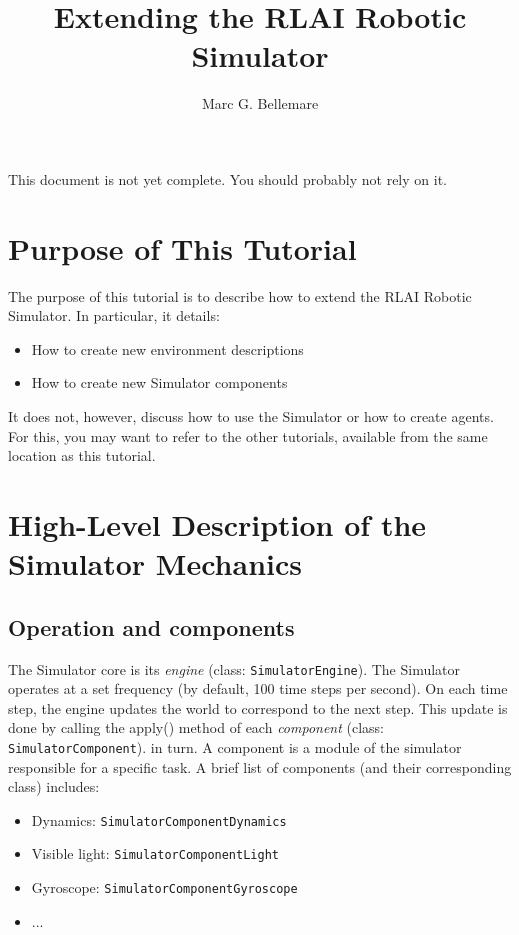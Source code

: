 \documentclass[12pt]{article}
\author{Marc G. Bellemare}
\title{Extending the RLAI Robotic Simulator}
\newcommand{\code}[1]{\texttt{#1}}
\newcommand{\keyword}[1]{\textit{#1}}
\begin{document}
\maketitle

This document is not yet complete. You should probably not rely on it.

\section{Purpose of This Tutorial}

The purpose of this tutorial is to describe how to extend the RLAI Robotic
Simulator. In particular, it details:

\begin{itemize}
\item{How to create new environment descriptions}
\item{How to create new Simulator components}
\end{itemize}

It does not, however, discuss how to use the Simulator or how to create agents.
For this, you may want to refer to the other tutorials, available from the
same location as this tutorial.


\section{High-Level Description of the Simulator Mechanics}

\subsection{Operation and components}

The Simulator core is its \keyword{engine} (class: \code{SimulatorEngine}). 
The Simulator operates at a set 
frequency (by default, 100 time steps per second). On each time step, the
engine updates the world to correspond to the next step. This update is done
by calling the apply() method of each \keyword{component} 
(class: \code{SimulatorComponent}). in turn. A component 
is a module of the simulator responsible for a specific task. A brief list
of components (and their corresponding class) includes:

\begin{itemize}
  \item{Dynamics: \code{SimulatorComponentDynamics}}
  \item{Visible light: \code{SimulatorComponentLight}}
  \item{Gyroscope: \code{SimulatorComponentGyroscope}}
  \item{...}
\end{itemize}
\end{document}

